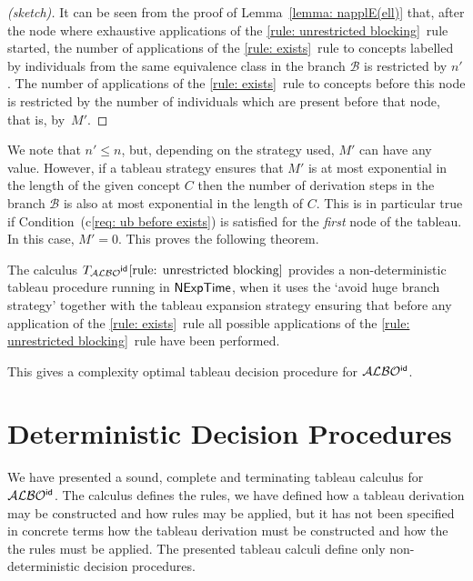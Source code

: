 \documentclass[leqno
,pdflatex
,prodmode
,acmtocl
]{acmsmall}
\newcommand{\mathcmd}[1]{\ensuremath{#1}\xspace}
\newcommand{\dlfont}{\mathcal}
\newcommand{\dl}[1]{\mathcmd{\dlfont{#1}}}
\newcommand{\idRole}{\mathcmd{\textsf{\upshape\mdseries id}}}
\newcommand{\ALBOid}{\dl{ALBO\smash[t]{\mbox{${}^{\idRole}$}}}}
\newcommand{\branch}[1]{\seg{#1}}
\newcommand{\seg}[1]{\mathcmd{\mathcal{#1}}}
\def\complexityfont{\sffamily\upshape}
\def\complexity#1{\mathcmd{\text{\complexityfont #1}}}
\def\NExpTime{\complexity{NExpTime}}
\newcommand{\TALBOidub}{\mathcmd{T_\ALBOid\eqref{rule: unrestricted blocking}}}
\begin{document}
\begin{proof}[(sketch)]
It can be seen from the proof of Lemma~\ref{lemma: napplE(ell)}
that, after the node where exhaustive
applications of the \eqref{rule: unrestricted blocking}~rule started,
the number of applications of the \eqref{rule: exists}~rule
to concepts labelled by individuals from the same equivalence class
in the branch $\branch{B}$ 
is restricted by $n'$.
The number of applications of the \eqref{rule: exists}~rule to concepts
before this node is restricted by the number of individuals which
are present before that node, that is, by~$M'$.
\end{proof}
We note that $n'\leq n$, but, depending on the strategy used, $M'$ can have any value. 
However, if a tableau strategy ensures that $M'$ is at most exponential
in the length of the given concept $C$
then the number of derivation steps in the branch $\branch{B}$
is also at most exponential in the length of $C$.
This is in particular true
if Condition~(c\ref{req: ub before exists})
is satisfied for the \emph{first} node of the tableau.
In this case, $M'=0$. 
This proves the following theorem.

\begin{theorem}
The calculus \TALBOidub provides a 
non-deterministic tableau procedure running in \NExpTime,
when it uses 
the `avoid huge branch strategy' together with
the tableau expansion strategy ensuring that before
any application of the \eqref{rule: exists}~rule
all possible applications of the \eqref{rule: unrestricted blocking}~rule
have been performed.
\end{theorem}

This gives a complexity optimal tableau decision procedure for
\ALBOid.

\section{Deterministic Decision Procedures}
\label{section_implementation}

We have presented a sound, complete and terminating tableau calculus for \ALBOid.
The calculus defines the rules, we have defined how a tableau
derivation may be constructed and how rules may be applied, but it has
not been specified in concrete terms how the tableau derivation must
be constructed and how the the rules must be applied.
The presented tableau calculi define only non-deterministic decision procedures.
\end{document}
